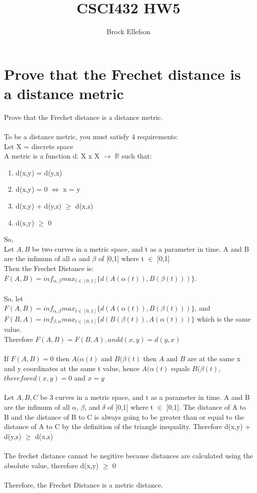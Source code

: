 \documentclass[10pt,letterpaper]{article}
\author{Brock Ellefson}
\title{CSCI432 HW5}
\newcommand{\R}{\mathbb{R}}
\begin{document}
\maketitle

\section{Prove that the Frechet distance is a distance metric}

Prove that the Frechet distance is a distance metric.\\
\\
To be a distance metric, you must satisfy 4 requirements:\\
Let X = discrete space\\
A metric is a function d: X x X $\rightarrow$ $\R$ such that:
\begin{enumerate}
  \item d(x,y) = d(y,x)
  \item d(x,y) = 0 $\Leftrightarrow$ x = y
  \item d(x,y) + d(y,z) $\geq$ d(x,z)
  \item d(x,y) $\geq$ 0
\end{enumerate}
So,\\
Let $A, B$ be two curves in a metric space, and t as a parameter in time. A and B are the infimum of all $\alpha$ and $\beta$ of [0,1] where t $\in$ [0,1]\\
Then the Frechet Distance is:\\
$F(A,B) = inf_{\alpha,\beta} max_{t\in[0,1]}\lbrace d(A(\alpha(t)),B(\beta(t)))\rbrace  $.\\
\\
So, let\\
$F(A,B) = inf_{\alpha,\beta} max_{t\in[0,1]}\lbrace d(A(\alpha(t)),B(\beta(t)))\rbrace $, and\\
$F(B,A) = inf_{\beta,\alpha} max_{t\in[0,1]}\lbrace d(B(\beta(t)),A(\alpha(t)))\rbrace $ which is the same value.\\
Therefore $F(A,B) = F(B,A), and d(x,y) = d(y,x)$\\
\\
If $F(A,B) = 0$ then $A(\alpha(t)$ and $B(\beta(t)$ then $A$ and $B$ are at the same x and y coordinates at the same t value, hence 
$A(\alpha(t)$ equals $B(\beta(t)$, $therefore d(x,y) = 0$ and $x = y$\\
\\
Let $A, B, C$ be 3 curves in a metric space, and t as a parameter in time. A and B are the infimum of all $\alpha$, $\beta$, and $\delta$ of [0,1] where t $\in$ [0,1]. The distance of A to B and the distance of B to C is always going to be greater than or equal to the distance of A to C by the definition of the triangle inequality. Therefore d(x,y) + d(y,z) $\geq$ d(x,z)\\
\\
The frechet distance cannot be negitive because distances are calculated using the absolute value, therefore d(x,y) $\geq$ 0\\
\\
Therefore, the Frechet Distance is a metric distance.
\end{document}
